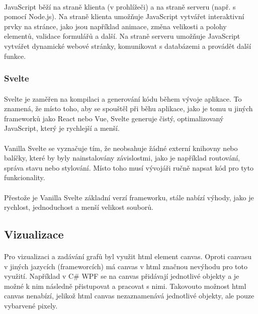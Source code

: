 \documentclass[12pt, titlepage, a4paper]{article}
\begin{document}
\paragraph{}
JavaScript běží na straně klienta (v prohlížeči) a na straně serveru (např. s pomocí Node.js). Na 
straně klienta umožňuje JavaScript vytvářet interaktivní prvky na stránce, jako jsou například 
animace, změna velikosti a polohy elementů, validace formulářů a další. Na straně serveru umožňuje 
JavaScript vytvářet dynamické webové stránky, komunikovat s databázemi a provádět další funkce.

\subsubsection{Svelte}
\paragraph{}
Svelte je zaměřen na kompilaci a generování kódu během vývoje aplikace. To znamená, že místo toho, 
aby se spouštěl při běhu aplikace, jako je tomu u jiných frameworků jako React nebo Vue, Svelte 
generuje čistý, optimalizovaný JavaScript, který je rychlejší a menší.
\paragraph{}
Vanilla Svelte se vyznačuje tím, že neobsahuje žádné externí knihovny nebo balíčky, které by 
byly nainstalovány závislostmi, jako je například routování, správa stavu nebo stylování. Místo 
toho musí vývojáři ručně napsat kód pro tyto funkcionality.
\paragraph{}
Přestože je Vanilla Svelte základní verzí frameworku, stále nabízí výhody, jako je rychlost, 
jednoduchost a menší velikost souborů.

\subsection{Vizualizace}
\paragraph{}
Pro vizualizaci a zadávání grafů byl využit html element canvas. Oproti 
canvasu v jiných jazycích (frameworcích) má canvas v html značnou nevýhodu
pro toto využití. Například v C\# WPF se na canvas přidávají jednotlivé objekty
a je možné k nim následně přistupovat a pracovat s nimi. Takovouto možnost html 
canvas nenabízí, jelikož html canvas nezaznamenává jednotlivé objekty, ale pouze
vybarvené pixely. \par
\end{document}
